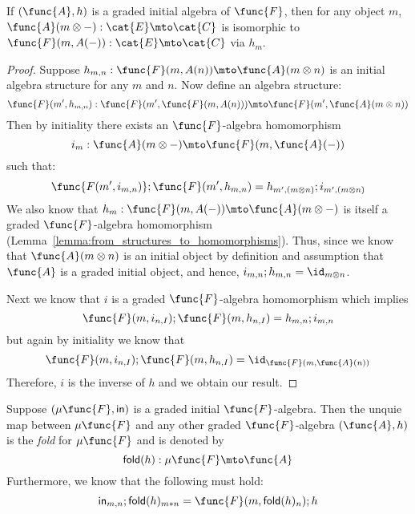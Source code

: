 \begin{lemma}
\label{lemma:graded_lambeks_lemma}
If $(\func{A},h)$ is a graded initial algebra of $\func{F}$, 
then for any object $m$, 
$\func{A}(m \otimes -) : \cat{E} \mto \cat{C}$ is isomorphic to 
$\func{F}(m, A(-)) : \cat{E} \mto \cat{C}$ via $h_m$.
\end{lemma}
\begin{proof}
Suppose $h_{m,n} : \func{F}(m,A(n)) \mto \func{A}(m \otimes n)$ is an initial
algebra structure for any $m$ and $n$.  
Now define an algebra structure:
\[
\func{F}(m',h_{m,n}) : \func{F}(m',\func{F}(m,A(n))) \mto \func{F}(m',\func{A}(m \otimes n))
\]
Then by initiality there exists an $\func{F}$-algebra homomorphism 
$$i_{m} : \func{A}(m \otimes -) \mto \func{F}(m,\func{A}(-))$$ such that:
$$\func{F(m',i_{m,n})} ; \func{F}(m',h_{m,n}) = h_{m',(m \otimes n)} ;
i_{m',(m \otimes n)}$$
We also know that $h_{m} : \func{F}(m,A(-)) \mto \func{A}(m \otimes -)$ is
itself a graded $\func{F}$-algebra homomorphism
(Lemma~\ref{lemma:from_structures_to_homomorphisms}). Thus, since we
know that $\func{A}(m \otimes n)$ is an initial object by definition and
assumption that $\func{A}$ is a graded initial object, and hence, 
$i_{m,n}; h_{m,n} = \id_{m \otimes n}$.  

Next we know that $i$ is a graded $\func{F}$-algebra homomorphism which
implies $$\func{F}(m,i_{n,I});\func{F}(m,h_{n,I}) =
h_{m,n};i_{m,n}$$ but again by initiality we know that
$$\func{F}(m,i_{n,I});\func{F}(m,h_{n,I}) =
\id_{\func{F}(m,\func{A}(n))}$$
Therefore, $i$ is the inverse of $h$ and we obtain our result.
\end{proof}

\begin{definition}
\label{def:graded_folds}
Suppose $(\mu\func{F},\mathsf{in})$ is a graded initial
$\func{F}$-algebra. Then the unquie map between $\mu\func{F}$ and any
other graded $\func{F}$-algebra $(\func{A},h)$ is the \emph{fold} for
$\mu\func{F}$ and is denoted by 
\[
    \mathsf{fold}(h) : \mu\func{F} \mto \func{A}
\]  
Furthermore, we know that the following must hold:
\[
\mathsf{in}_{m,n};\mathsf{fold}(h)_{m * n} = \func{F}(m,\mathsf{fold}(h)_n);h
\]
\end{definition}

